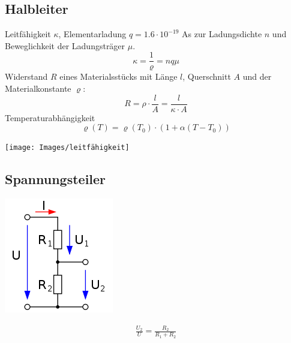 \subsection{Halbleiter}
Leitfähigkeit $\kappa$, Elementarladung $q = 1.6\cdot10^{-19}$ As zur Ladungsdichte $n$ und Beweglichkeit der Ladungsträger $\mu$.
\[
\kappa = \frac{1}{\varrho} = nq\mu
\]
Widerstand $R$ eines Materialsstücks mit Länge $l$, Querschnitt $A$ und der Materialkonstante $\varrho$:
\[
R = \rho \cdot \frac{l}{A} = \frac{l}{\kappa \cdot A}
\]
Temperaturabhängigkeit
\[
\varrho(T) = \varrho(T_0) \cdot (1 + \alpha(T - T_0))
\]

\texttt{[image: Images/leitfähigkeit]}

\subsection{Spannungsteiler}
\begin{minipage}{0.20\textwidth}
	\includegraphics[width=\linewidth,keepaspectratio=true]{./Images/spannungsteiler}
\end{minipage}%
\begin{minipage}{0.30\textwidth}
	\begin{align*}
		\frac{U_2}{U} = \frac{R_2}{R_1 + R_2}
	\end{align*}
\end{minipage}
